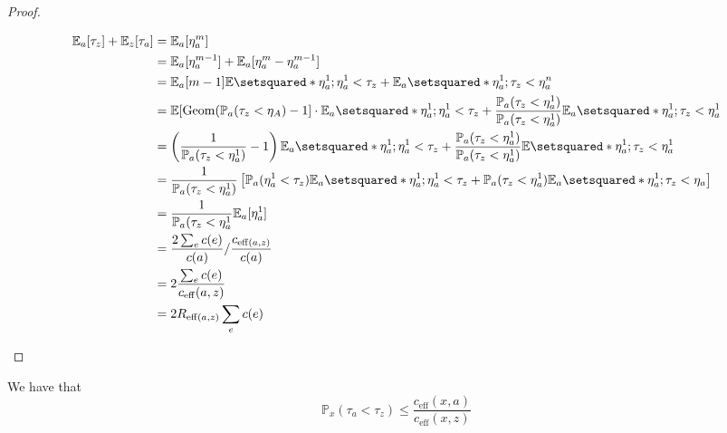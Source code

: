 \begin{proof}
\begin{enumerate}
        \begin{align*}
          \mathbb{E}_{a}[\tau_z] + \mathbb{E}_{z}[\tau_a] &= \mathbb{E}_{a}[\eta_a^m] \\
                                                          &=\mathbb{E}_{a}[\eta_a^{m-1}]+ \mathbb{E}_a[\eta_a^m - \eta_a^{m-1}] \\
                                                          &=\mathbb{E}_a[m-1]\mathbb{E} \setsquared*{\eta_a^1 ; \eta_{a}^1 < \tau_z} + \mathbb{E}_{a} \setsquared*{\eta_a^1 ;\tau_z < \eta_a^n} \\ &= \mathbb{E}[\mathrm{Geom}(\mathbb{P}_{a}(\tau_z<\eta_A)-1] \cdot \mathbb{E}_{a} \setsquared*{\eta_a^1 ;\eta_a^1 < \tau_z} + \frac{\mathbb{P}_{a}(\tau_z<\eta_a^1)}{\mathbb{P}_a(\tau_z< \eta_a^1)} \mathbb{E}_a \setsquared*{\eta_a^1 ;\tau_z < \eta_a^1} \\
                                                          &=\left(\frac{1}{\mathbb{P}_a(\tau_z < \eta_a^1)}-1\right) \mathbb{E}_a \setsquared*{\eta_a^1 ;\eta_a^1< \tau_z} + \frac{\mathbb{P}_{a}(\tau_z<\eta_a^1)}{\mathbb{P}_a(\tau_z< \eta_a^1)} \mathbb{E} \setsquared*{\eta_a^1  ;\tau_z < \eta_a^1} \\
                                                          &=\frac{1}{\mathbb{P}_a (\tau_z< \eta_a^1)} \left[\mathbb{P}_a(\eta_a^1<\tau_z) \mathbb{E}_a \setsquared*{\eta_a^1 ;\eta_a^1 < \tau_z}+ \mathbb{P}_a(\tau_z<\eta_a^1)  \mathbb{E}_a \setsquared*{\eta_a^1 ;\tau_z < \eta_a}\right] \\
                                                          &=\frac{1}{\mathbb{P}_a(\tau_z < \eta_a^1} \mathbb{E}_a[\eta_a^1] \\
                                                          &= \frac{2 \sum_e c(e)}{c(a)} / \frac{c_{\mathrm{eff}(a,z)}}{c(a)} \\
                                                          &=2 \frac{\sum_e c(e)}{c_{\mathrm{eff}}(a,z)} \\
                                                          &=2 R_{\mathrm{eff}(a,z)} \sum_e c(e)
        \end{align*}
        
    \end{enumerate}

\end{proof}



\begin{exer}
    We have that 
  \[\mathbb{P}_x(\tau_a< \tau_z) \leq \frac{c_{\mathrm{eff}}(x,a)}{c_{\mathrm{eff}}(x,z)}\]
\end{exer}

